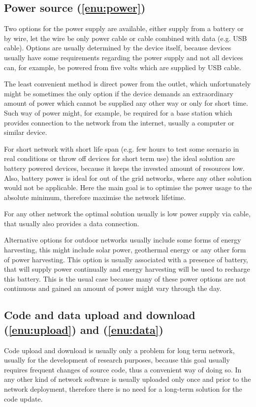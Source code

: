 \documentclass[
  print, %
  table,   %
  nolof,     %
  nolot,     %
           oneside
]{fithesis3}
\begin{document}
  \subsection{Power source (\ref{enu:power})}
  Two options for the power supply are available, either supply from a battery or by wire, let the wire be only power cable or cable combined with data (e.g. USB cable). Options are usually determined by the device itself, because devices usually have some requirements regarding the power supply and not all devices can, for example, be powered from five volts which are supplied by USB cable.

  The least convenient method is direct power from the outlet, which unfortunately might be sometimes the only option if the device demands an extraordinary amount of power which cannot be supplied any other way or only for short time. Such way of power might, for example, be required for a base station which provides connection to the network from the internet, usually a computer or similar device.

  For short network with short life span (e.g. few hours to test some scenario in real conditions or throw off devices for short term use) %
  the ideal solution are battery powered devices, because it keeps the invested amount of resources low. Also, battery power is ideal for out of the grid networks, where any other solution would not be applicable. Here the main goal is to optimise the power usage to the absolute minimum, therefore maximise the network lifetime.

  For any other network the optimal solution usually is low power supply via cable, that usually also provides a data connection.

  Alternative options for outdoor networks usually include some forms of energy harvesting, this might include solar power, geothermal energy or any other form of power harvesting. This option is usually associated with a presence of battery, that will supply power continually and energy harvesting will be used to recharge this battery. This is the usual case because many of these power options are not continuous and gained an amount of power might vary through the day.

  \subsection{Code and data upload and download (\ref{enu:upload}) and (\ref{enu:data})}
  Code upload and download is usually only a problem for long term network, usually for the development of research purposes, because this goal usually requires frequent changes of source code, thus a convenient way of doing so. In any other kind of network software is usually uploaded only once and prior to the network deployment, therefore there is no need for a long-term solution for the code update.
\end{document}
